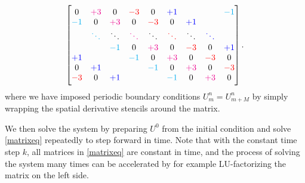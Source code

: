 \begin{equation*}
\begin{bmatrix}
0           & \color{magenta} +3      & 0           & \color{red} -3      & 0           & \color{blue} +1      &             &             & \color{cyan} -1      \\
\color{cyan} -1      & 0           & \color{magenta} +3      & 0           & \color{red} -3      & 0           & \color{blue} +1      &             &             \\
            & \color{cyan} \ddots  & \ddots      & \color{magenta} \ddots  & \ddots      & \color{red} \ddots  & \ddots      & \color{blue} \ddots  &             \\
            &             & \color{cyan} -1      & 0           & \color{magenta} +3      & 0           & \color{red} -3      & 0           & \color{blue} +1      \\
\color{blue} +1      &             &             & \color{cyan} -1      & 0           & \color{magenta} +3      & 0           & \color{red} -3      & 0           \\
0           & \color{blue} +1      &             &             & \color{cyan} -1      & 0           & \color{magenta} +3      & 0           & \color{red} -3      \\
\color{red} -3      & 0           & \color{blue} +1      &             &             & \color{cyan} -1      & 0           & \color{magenta} +3      & 0           \\
\end{bmatrix}
.
\end{equation*}
where we have imposed periodic boundary conditions $U_m^n = U_{m+M}^n$ by simply wrapping the spatial derivative stencils around the matrix.

We then solve the system by preparing $U^0$ from the initial condition and solve \cref{matrixeq} repeatedly to step forward in time.
Note that with the constant time step $k$, all matrices in \cref{matrixeq} are constant in time, and the process of solving the system many times can be accelerated by for example LU-factorizing the matrix on the left side.

